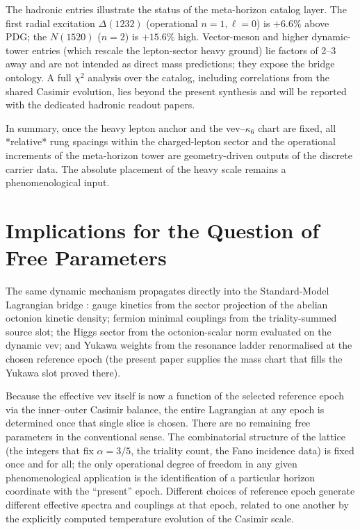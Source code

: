 \documentclass[11pt]{amsart}
\begin{document}
The hadronic entries illustrate the status of the meta-horizon catalog layer. The first radial excitation \(\Delta(1232)\) (operational \(n=1,\ell=0\)) is \(+6.6\%\) above PDG; the \(N(1520)\) (\(n=2\)) is \(+15.6\%\) high. Vector-meson and higher dynamic-tower entries (which rescale the lepton-sector heavy ground) lie factors of 2--3 away and are not intended as direct mass predictions; they expose the bridge ontology. A full \(\chi^2\) analysis over the catalog, including correlations from the shared Casimir evolution, lies beyond the present synthesis and will be reported with the dedicated hadronic readout papers.

In summary, once the heavy lepton anchor and the vev--\(\kappa_6\) chart are fixed, all *relative* rung spacings within the charged-lepton sector and the operational increments of the meta-horizon tower are geometry-driven outputs of the discrete carrier data. The absolute placement of the heavy scale remains a phenomenological input.

\section{Implications for the Question of Free Parameters}

The same dynamic mechanism propagates directly into the Standard-Model
Lagrangian bridge \cite{hqiv-sm-lagrangian-paper}: gauge kinetics from the
sector projection of the abelian octonion kinetic density; fermion minimal
couplings from the triality-summed source slot; the Higgs sector from the
octonion-scalar norm evaluated on the dynamic vev; and Yukawa weights from
the resonance ladder renormalised at the chosen reference epoch (the present
paper supplies the mass chart that fills the Yukawa slot proved there).

Because the effective vev itself is now a function of the selected reference epoch via the inner--outer Casimir balance, the entire Lagrangian at any epoch is determined once that single slice is chosen. There are no remaining free parameters in the conventional sense. The combinatorial structure of the lattice (the integers that fix $\alpha=3/5$, the triality count, the Fano incidence data) is fixed once and for all; the only operational degree of freedom in any given phenomenological application is the identification of a particular horizon coordinate with the ``present'' epoch. Different choices of reference epoch generate different effective spectra and couplings at that epoch, related to one another by the explicitly computed temperature evolution of the Casimir scale.
\end{document}
